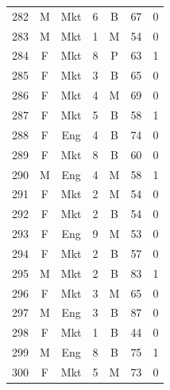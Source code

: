 \documentclass[11pt,a4paper]{article}
\begin{document}
\begin{center}
\begin{tabular}[t]{@{}r c c r c r c@{}}
282 & M & Mkt & 6 & B & 67 & 0 \\
283 & M & Mkt & 1 & M & 54 & 0 \\
284 & F & Mkt & 8 & P & 63 & 1 \\
285 & F & Mkt & 3 & B & 65 & 0 \\
286 & F & Mkt & 4 & M & 69 & 0 \\
287 & F & Mkt & 5 & B & 58 & 1 \\
288 & F & Eng & 4 & B & 74 & 0 \\
289 & F & Mkt & 8 & B & 60 & 0 \\
290 & M & Eng & 4 & M & 58 & 1 \\
291 & F & Mkt & 2 & M & 54 & 0 \\
292 & F & Mkt & 2 & B & 54 & 0 \\
293 & F & Eng & 9 & M & 53 & 0 \\
294 & F & Mkt & 2 & B & 57 & 0 \\
295 & M & Mkt & 2 & B & 83 & 1 \\
296 & F & Mkt & 3 & M & 65 & 0 \\
297 & M & Eng & 3 & B & 87 & 0 \\
298 & F & Mkt & 1 & B & 44 & 0 \\
299 & M & Eng & 8 & B & 75 & 1 \\
300 & F & Mkt & 5 & M & 73 & 0 \\
\bottomrule
\end{tabular}
\end{center}
\clearpage
\end{document}
